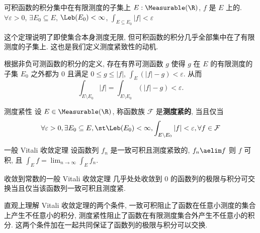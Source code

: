 \begin{thm}
    {可积函数的积分集中在有限测度的子集上}
    \(E:\Measurable(\R)\), \(f\) 是 \(E\) 上的\IntegrableFunc{}. \(\forall\varepsilon>0\), \(\exists E_0\subseteq E\), \(\Leb(E_0)<\infty\), \(\int_{E\subseteq E_0} |f|<\varepsilon\)
\end{thm}
\begin{rmk}
    这个定理说明了即使集合本身测度无限, 但可积函数的积分几乎全部集中在了有限测度的子集上. 这也是我们定义测度紧致性的动机.
\end{rmk}
\begin{prf}
    根据非负可测函数的积分的定义, 存在有界可测函数 \(g\) 使得 \(g\) 在 \(E\) 的有限测度的子集 \(E_0\) 之外都为 0 且满足 \(0\leq g\leq |f|\), \(\int_E (|f|-g)<\varepsilon\). 从而 
    \[\int_{E\setminus E_0} |f| = \int_{E\setminus E_0} (|f|-g) < \varepsilon. \]
\end{prf}
\begin{dfn}
    {测度紧性}
    设 $E\in\Measurable(\R)$, 称函数族 \(\mathcal{F}\) 是\textbf{测度紧的}, 当且仅当 
    \[\forall\varepsilon>0, \exists E_0\subseteq E, \st \Leb(E_0)<\infty, \int_{E\setminus E_0} |f|<\varepsilon, \forall f\in\mathcal{F}\]
\end{dfn}
\begin{thm}
    [vct-2]
    {一般 Vitali 收敛定理}
    设函数列 \(f_n\) 是一致可积且测度紧致的, \(f_n\aelim f\) 则 \(f\) 可积, 且 \(\int_E f = \lim_{n\to\infty}\int_E f_n\).
\end{thm}
\begin{crl}
    {收敛到常数的一般 Vitali 收敛定理}
    几乎处处收敛到 0 的函数列的极限与积分可交换当且仅当该函数列一致可积且测度紧.
\end{crl}
\begin{rmk}
    直观上理解 Vitali 收敛定理的两个条件, 一致可积阻止了函数在任意小测度的集合上产生不任意小的积分, 测度紧性阻止了函数在有限测度集合外产生不任意小的积分. 这两个条件加在一起共同保证了函数列的极限与积分可以交换.
\end{rmk}
